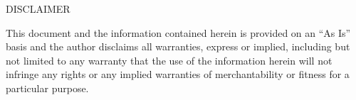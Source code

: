 \begin{center}
    {\Large DISCLAIMER}
\end{center}

This document and the information contained herein is provided on an “As Is” basis and the author disclaims all warranties, express or implied, including but not limited to any warranty that the use of the information herein will not infringe any rights or any implied warranties of merchantability or fitness for a particular purpose.
